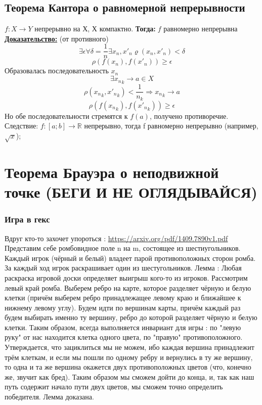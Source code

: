 \documentclass[12pt, a4paper]{article}
\newcommand{\nl}{\newline}
\newcommand{\proof}{\textbf{\underline{Доказательство:}} }
\newcommand{\then}{\textbf{Тогда:}}
\begin{document}
	
	\subsection{Теорема Кантора о равномерной непрерывности} 
	$f : X \rightarrow Y$ непрерывно на Х, Х компактно. \nl
	\then $\; f$ равномерно непрерывна \nl
	\proof (от противного)
	$$ \exists \epsilon \forall \delta = \frac{1}{n} \exists x_n, {x'}_n \varrho(x_n, {x'}_n) < \delta $$
	$$ \rho(f(x_n),f({x'}_n)) \geqslant \epsilon $$ 
	Образовалась последовательность $x_n$ 
	$$\exists {x_n}_k \rightarrow a \in X $$ 
	$$ \rho({x_n}_k, {{x'}_n}_k)<\frac{1}{{n_k}} \Rightarrow {x_n}_k \rightarrow a $$ 
	$$ \rho(f({x_n}_k), f({{x'}_n}_k)) \geqslant \epsilon $$ 
	Но обе последовательности стремятся к $f(a)$, получено противоречие. \nl
	Следствие: $f : [a; b] \rightarrow \mathbb{R}$ непрерывно, тогда f равномерно непрерывно (например, $\sqrt{x}$);
	
	\section{Теорема Брауэра о неподвижной точке (БЕГИ И НЕ ОГЛЯДЫВАЙСЯ)}
	\subsubsection{Игра в гекс}
	Вдруг кто-то захочет упороться : \url{https://arxiv.org/pdf/1409.7890v1.pdf} \nl
	Представим себе ромбовидное поле n на m, состоящее из шестиугольников. Каждый игрок (чёрный и белый) владеет парой противоположных сторон ромба. За каждый ход игрок раскрашивает один из шестугольников. \nl
	Лемма : Любая раскраска игровой доски определяет выигрыш кого-то из игроков. \nl
	Рассмотрим левый край ромба. Выберем ребро на карте, которое разделяет чёрную и белую клетки (причём выберем ребро принадлежащее левому краю и ближайшее к нижнему левому углу). Будем идти по вершинам карты, причём каждый раз будем выбирать именно ту вершину, ребро до которой разделяет чёрную и белую клетки. Таким образом, всегда выполняется инвариант для игры : по "левую руку" от нас находится клетка одного цвета, по "правую" противоположного. Утверждается, что зациклиться мы не можем, ибо каждая вершина принадлежит трём клеткам, и если мы пошли по одному ребру и вернулись в ту же вершину, то одна и та же вершина окажется двух противоположных цветов (что, конечно же, звучит как бред). Таким образом мы сможем дойти до конца, и, так как наш путь содержит начало пути двух цветов, мы сможем точно определить победителя. Лемма доказана. \nl
	
\end{document}
